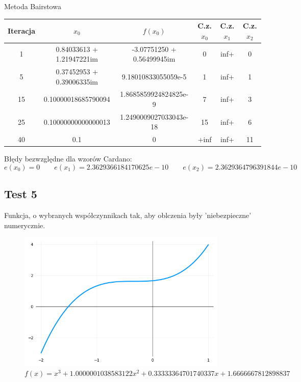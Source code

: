 \documentclass[a4paper]{article}
\begin{document}
    \begin{center}
        Metoda Bairstowa
    \end{center}
    \begin{center}
        \begin{tabular}{|c|c|c|c|c|c|} 
            \hline
            Iteracja & $x_0$ & $f(x_0)$ & C.z. $x_0$ & C.z. $x_1$ & C.z. $x_2$ \\
            \hline
            1 & 0.84033613 + 1.21947221im & -3.07751250 + 0.56499945im & 0 & inf+ & 0 \\ 
            \hline
            5 & 0.37452953 + 0.39006335im & 9.18010833055059e-5 & 1 & inf+ & 1 \\ 
            \hline
            15 & 0.10000018685790094 & 1.8685859924824825e-9 & 7 & inf+ & 3 \\
            \hline
            25 & 0.10000000000000013 & 1.2490009027033043e-18 & 15 & inf+ & 6 \\
            \hline
            40 & 0.1 & 0 & +inf & inf+ & 11 \\
            \hline
        \end{tabular}
    \end{center}

    \vspace{5mm}

    \begin{center}
        Błędy bezwzględne dla wzorów Cardano:
        \[
            e(x_0) = 0 \qquad e(x_1) = 2.3629366184170625e-10 \qquad e(x_2) = 2.3629364796391844e-10  
        \]
    \end{center}

\newpage
\subsection{Test 5}
Funkcja, o wybranych współczynnikach tak, aby oblczenia były 'niebezpieczne' numerycznie.
    \begin{figure}[h]
        \centering
        \includegraphics[width=10cm]{5}
        \caption{$f(x) = x^3 + 1.0000001038583122x^2 + 0.33333364701740337x + 1.6666667812898837$}
    \end{figure}
\end{document}

